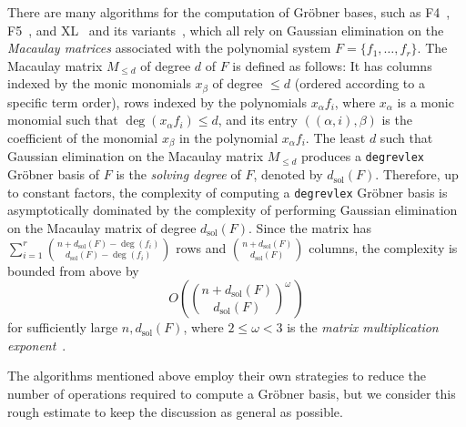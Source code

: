 \documentclass[11pt]{article}
\theoremstyle{plain}
\theoremstyle{definition}
\theoremstyle{remark}
\begin{document}
There are many algorithms for the computation of Gr\"obner bases, such as F4~\cite{FAUGERE199961}, F5~\cite{F5}, and XL~\cite{XL} and its variants~\cite{buchmann_et_al:DagSemProc.09031.10, 10.1007/978-3-540-88403-3_14}, which all rely on Gaussian elimination on the \textit{Macaulay matrices} associated with the polynomial system $F=\{f_1,\dots,f_r\}$. The Macaulay matrix $M_{\leq d}$ of degree $d$ of $F$ is defined as follows: It has columns indexed by the monic monomials $x_\beta$ of degree $\leq d$ (ordered according to a specific term order), rows indexed by the polynomials $x_{\alpha}f_i$, where $x_{\alpha}$ is a monic monomial such that $\operatorname{deg}(x_{\alpha}f_i)\leq d$, and its entry $((\alpha,i),\beta)$ is the coefficient of the monomial $x_\beta$ in the polynomial $x_{\alpha}f_i$. The least $d$ such that Gaussian elimination on the Macaulay matrix $M_{\leq d}$ produces a \texttt{degrevlex} Gr\"obner basis of $F$ is the \textit{solving degree} of $F$, denoted by $d_{\operatorname{sol}}(F)$. Therefore, up to constant factors, the complexity of computing a \texttt{degrevlex} Gr\"obner basis is asymptotically dominated by the complexity of performing Gaussian elimination~\cite[111-118]{matrixcomput} on the Macaulay matrix of degree $d_{\operatorname{sol}}(F)$. Since the matrix has $\sum\limits_{i=1}^r\binom{n+d_{\operatorname{sol}}(F)-\operatorname{deg}(f_i)}{d_{\operatorname{sol}}(F)-\operatorname{deg}(f_i)}$ rows and $\binom{n+d_{\operatorname{sol}}(F)}{d_{\operatorname{sol}}(F)}$ columns, the complexity is bounded from above by
\begin{equation*}
    O\left(\binom{n+d_{\operatorname{sol}}(F)}{d_{\operatorname{sol}}(F)}^\omega\,\right)
\end{equation*}
for sufficiently large $n, d_{\operatorname{sol}}(F)$, where $2\leq\omega<3$ is the \textit{matrix multiplication exponent}~\cite[313-316]{vonzurGathen_Gerhard_2013}.

The algorithms mentioned above employ their own strategies to reduce the number of operations required to compute a Gr\"obner basis, but we consider this rough estimate to keep the discussion as general as possible.\\
\end{document}
